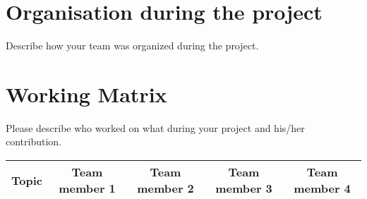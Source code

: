 \section{Organisation during the project}
Describe how your team was organized during the project.

\section{Working Matrix}
Please describe who worked on what during your project and his/her contribution. 

\begin{figure*}
\begin{tabular}{ccccc}
	Topic & Team member 1 & Team member 2 & Team member 3 & Team member 4\\\hline
	
	\hline
\end{tabular}
\end{figure*}